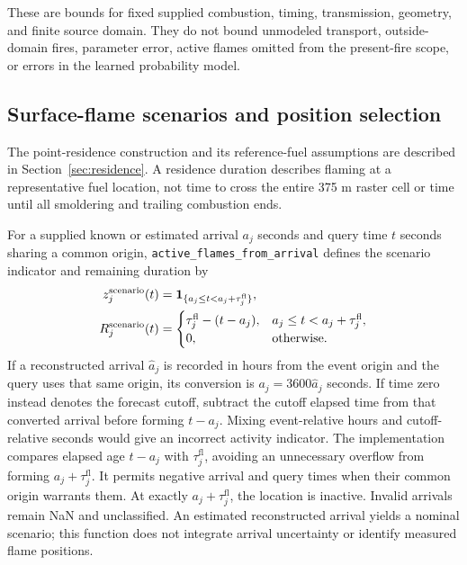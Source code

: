 \documentclass[11pt,a4paper]{article}
\newcommand{\Ind}{\mathbf{1}}
\begin{document}
These are bounds for fixed supplied combustion, timing, transmission,
geometry, and finite source domain. They do not bound unmodeled transport,
outside-domain fires, parameter error, active flames omitted from the
present-fire scope, or errors in the learned probability model.

\subsection{Surface-flame scenarios and position selection}
\label{sec:heat-flames}

The point-residence construction and its reference-fuel assumptions are
described in Section~\ref{sec:residence}. A residence duration describes
flaming at a representative fuel location, not time to cross the entire
375 m raster cell or time until all smoldering and trailing combustion ends.

For a supplied known or estimated arrival $a_j$ seconds and query time
$t$ seconds sharing a common origin, \texttt{active\_flames\_from\_arrival}
defines the scenario indicator and remaining duration by
\begin{align}
 z_j^{\rm scenario}(t)&=\Ind_{\{a_j\le t<a_j+\tau_j^{\mathrm{fl}}\}},\\
 R_j^{\rm scenario}(t)&=
 \begin{cases}\tau_j^{\mathrm{fl}}-(t-a_j),&a_j\le t<a_j+\tau_j^{\mathrm{fl}},\\0,&\text{otherwise.}\end{cases}
\end{align}
If a reconstructed arrival $\widehat a_j$ is recorded in hours from the
event origin and the query uses that same origin, its conversion is
$a_j=3600\widehat a_j$ seconds. If time zero instead denotes the forecast
cutoff, subtract the cutoff elapsed time from that converted arrival before
forming $t-a_j$. Mixing event-relative hours and cutoff-relative seconds
would give an incorrect activity indicator.
The implementation compares elapsed age $t-a_j$ with $\tau_j^{\mathrm{fl}}$, avoiding an
unnecessary overflow from forming $a_j+\tau_j^{\mathrm{fl}}$. It permits negative arrival
and query times when their common origin warrants them. At exactly
$a_j+\tau_j^{\mathrm{fl}}$, the location is inactive. Invalid arrivals remain NaN and
unclassified. An estimated reconstructed arrival yields a nominal scenario;
this function does not integrate arrival uncertainty or identify measured
flame positions.
\end{document}
